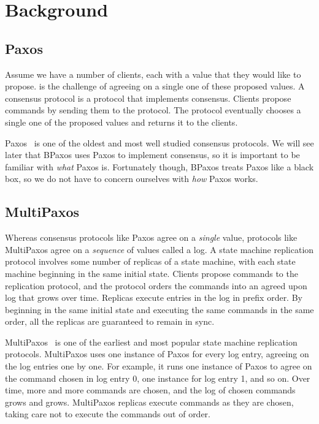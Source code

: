 \section{Background}

\subsection{Paxos}
Assume we have a number of clients, each with a value that they would like to
propose.  is the challenge of agreeing on a single one of
these proposed values. A consensus protocol is a protocol that implements
consensus. Clients propose commands by sending them to the protocol. The
protocol eventually chooses a single one of the proposed values and returns it
to the clients.

Paxos~\cite{lamport1998part, lamport2001paxos} is one of the oldest and most
well studied consensus protocols. We will see later that BPaxos uses Paxos to
implement consensus, so it is important to be familiar with \emph{what} Paxos
is. Fortunately though, BPaxos treats Paxos like a black box, so we do not have
to concern ourselves with \emph{how} Paxos works.

\subsection{MultiPaxos}
Whereas consensus protocols like Paxos agree on a \emph{single} value,
 protocols like MultiPaxos agree on a
\emph{sequence} of values called a log.  A state machine replication protocol
involves some number of replicas of a state machine, with each state machine
beginning in the same initial state. Clients propose commands to the
replication protocol, and the protocol orders the commands into an agreed upon
log that grows over time. Replicas execute entries in the log in prefix order.
By beginning in the same initial state and executing the same commands in the
same order, all the replicas are guaranteed to remain in sync.

MultiPaxos~\cite{van2015paxos} is one of the earliest and most popular state
machine replication protocols. MultiPaxos uses one instance of Paxos for every
log entry, agreeing on the log entries one by one. For example, it runs one
instance of Paxos to agree on the command chosen in log entry 0, one instance
for log entry 1, and so on. Over time, more and more commands are chosen, and
the log of chosen commands grows and grows. MultiPaxos replicas execute
commands as they are chosen, taking care not to execute the commands out of
order.


